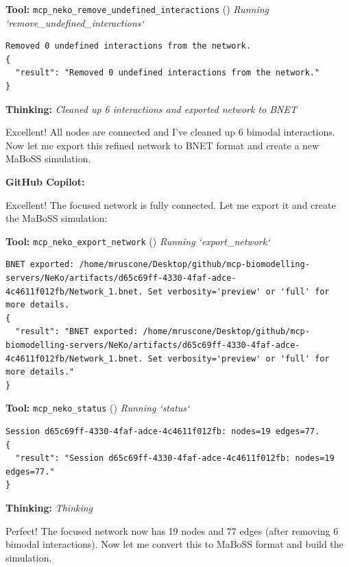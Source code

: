 \documentclass[11pt,a4paper]{article}
\begin{document}
\begin{toolokbox}
\textbf{Tool:} \texttt{mcp\_neko\_remove\_undefined\_interactions} (\checkmark)
\textit{Running `remove\_undefined\_interactions`}
\begin{lstlisting}
Removed 0 undefined interactions from the network.
{
  "result": "Removed 0 undefined interactions from the network."
}
\end{lstlisting}
\end{toolokbox}
\begin{thinkbox}
\textbf{Thinking:} \textit{Cleaned up 6 interactions and exported network to BNET}

Excellent! All nodes are connected and I've cleaned up 6 bimodal interactions. Now let me export this refined network to BNET format and create a new MaBoSS simulation.

\end{thinkbox}
\begin{copilotbox}
\textbf{GitHub Copilot:}

Excellent! The focused network is fully connected. Let me export it and create the MaBoSS simulation:

\end{copilotbox}
\begin{toolokbox}
\textbf{Tool:} \texttt{mcp\_neko\_export\_network} (\checkmark)
\textit{Running `export\_network`}
\begin{lstlisting}
BNET exported: /home/mruscone/Desktop/github/mcp-biomodelling-servers/NeKo/artifacts/d65c69ff-4330-4faf-adce-4c4611f012fb/Network_1.bnet. Set verbosity='preview' or 'full' for more details.
{
  "result": "BNET exported: /home/mruscone/Desktop/github/mcp-biomodelling-servers/NeKo/artifacts/d65c69ff-4330-4faf-adce-4c4611f012fb/Network_1.bnet. Set verbosity='preview' or 'full' for more details."
}
\end{lstlisting}
\end{toolokbox}
\begin{toolokbox}
\textbf{Tool:} \texttt{mcp\_neko\_status} (\checkmark)
\textit{Running `status`}
\begin{lstlisting}
Session d65c69ff-4330-4faf-adce-4c4611f012fb: nodes=19 edges=77.
{
  "result": "Session d65c69ff-4330-4faf-adce-4c4611f012fb: nodes=19 edges=77."
}
\end{lstlisting}
\end{toolokbox}
\begin{thinkbox}
\textbf{Thinking:} \textit{Thinking}

Perfect! The focused network now has 19 nodes and 77 edges (after removing 6 bimodal interactions). Now let me convert this to MaBoSS format and build the simulation.

\end{thinkbox}
\end{document}
